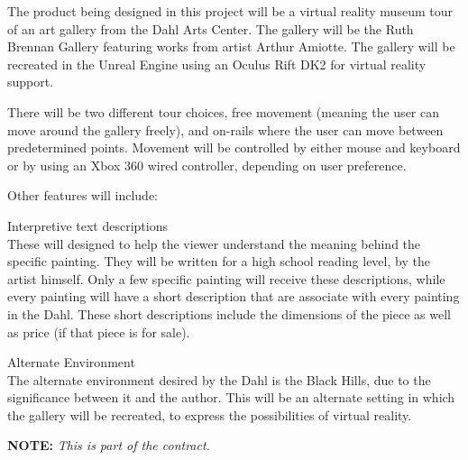 

The product being designed in this project will be a virtual reality museum tour of an art gallery from the Dahl Arts Center.  The gallery will be the Ruth Brennan Gallery featuring works from artist Arthur Amiotte.  The gallery will be recreated in the Unreal Engine using an Oculus Rift DK2 for virtual reality support.  

There will be two different tour choices, free movement (meaning the user can move around the gallery freely), and on-rails where the user can move between predetermined points.  Movement will be controlled by either mouse and keyboard or by using an Xbox 360 wired controller, depending on user preference.


Other features will include:
\begin{description}
\item Interpretive text descriptions \hfill \\
	These will designed to help the viewer understand the meaning behind the specific painting.  They will be written for a high school reading level, by the artist himself.  Only a few specific painting will receive these descriptions, while every painting will have a short description that are associate with every painting in the Dahl.  These short descriptions include the dimensions of the piece as well as price (if that piece is for sale).
	
\item Alternate Environment \hfill \\
	The alternate environment desired by the Dahl is the Black Hills, due to the significance between it and the author.  This will be an alternate setting in which the gallery will be recreated, to express the possibilities  of virtual reality.  
\end{description}
\vspace{2\baselineskip}

\centerline{\Large {\bf NOTE:} {\em This is part of the contract.}}

